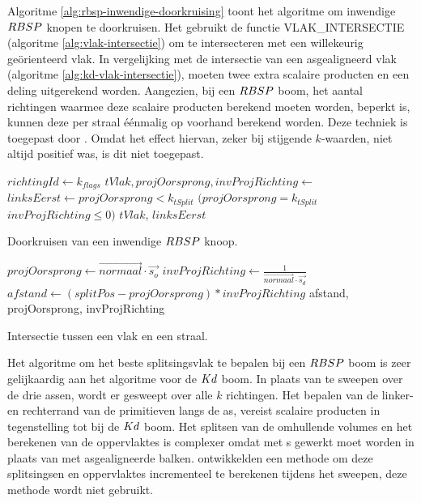 Algoritme \ref{alg:rbsp-inwendige-doorkruising} toont het algoritme om inwendige $RBSP$ knopen te doorkruisen.
Het gebruikt de functie VLAK\_INTERSECTIE (algoritme \ref{alg:vlak-intersectie}) om te intersecteren met een willekeurig geörienteerd vlak.
In vergelijking met de intersectie van een asgealigneerd vlak (algoritme \ref{alg:kd-vlak-intersectie}), moeten twee extra scalaire producten en een deling uitgerekend worden.
Aangezien, bij een $RBSP$ boom, het aantal richtingen waarmee deze scalaire producten berekend moeten worden, beperkt is, kunnen deze per straal éénmalig op voorhand berekend worden.
Deze techniek is toegepast door \authorBudge{} \cite{Budge}.
Omdat het effect hiervan, zeker bij stijgende $k$-waarden, niet altijd positief was, is dit niet toegepast.\\
\begin{dutchalgorithm}
    \begin{algorithmic}       
            \State $richtingId \gets k_{flags}$
            \State $tVlak, projOorsprong, invProjRichting \gets $ 
            \State $linksEerst \gets projOorsprong < k_{tSplit}$ \Or $(projOorsprong = k_{tSplit}$ \And $invProjRichting \leq 0)$
            \State \Return $tVlak$, $linksEerst$
        \EndFunction
    \end{algorithmic}
    \caption{Doorkruisen van een inwendige $RBSP$ knoop.}
    \label{alg:rbsp-inwendige-doorkruising}
\end{dutchalgorithm}

\begin{dutchalgorithm}
    \begin{algorithmic}       
            \State $projOorsprong \gets \vec{normaal} \cdot \vec{s_o}$
            \State $invProjRichting \gets \frac{1}{\vec{normaal} \cdot \vec{s_d}}$
            \State $afstand \gets (splitPos - projOorsprong) * invProjRichting $
            \State \Return afstand, projOorsprong, invProjRichting
        \EndFunction
    \end{algorithmic}
    \caption{Intersectie tussen een vlak en een straal.}
    \label{alg:vlak-intersectie}
\end{dutchalgorithm}

Het algoritme om het beste splitsingsvlak te bepalen bij een $RBSP$ boom is zeer gelijkaardig aan het algoritme voor de $Kd$ boom.
In plaats van te sweepen over de drie assen, wordt er gesweept over alle $k$ richtingen.
Het bepalen van de linker- en rechterrand van de primitieven langs de as, vereist scalaire producten in tegenstelling tot bij de $Kd$ boom.
Het splitsen van de omhullende volumes en het berekenen van de oppervlaktes is complexer omdat met \symKDOP{}s gewerkt moet worden in plaats van met asgealigneerde balken.
\authorBudge{} \cite{Budge} ontwikkelden een methode om deze splitsingsen en oppervlaktes incrementeel te berekenen tijdens het sweepen, deze methode wordt niet gebruikt.


